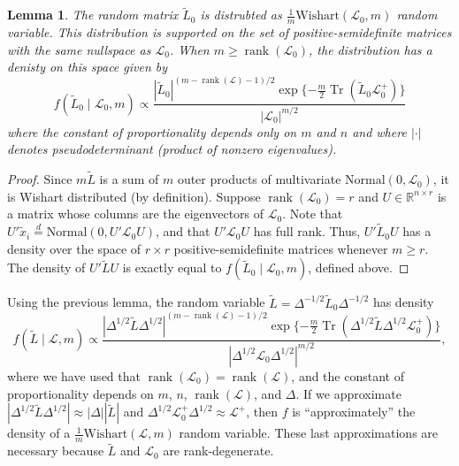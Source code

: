 \documentclass[12pt]{article}
\newcommand{\reals}{\mathbb{R}}
\DeclareMathOperator*{\Tr}{Tr}
\DeclareMathOperator*{\rank}{rank}
\theoremstyle{plain}
\newtheorem{lemma}[theorem]{Lemma}
\begin{document}
\begin{lemma}\label{L:approx-wishart}
  The random matrix $\tilde L_0$ is distrubted as $\tfrac{1}{m}
  \mathrm{Wishart }(\mathcal{L}_0, m)$ random variable.
  This distribution is supported on the set of
  positive-semidefinite matrices with the same nullspace as $\mathcal{L}_0$.  When
  $m \geq \rank(\mathcal{L}_0)$, the distribution has a denisty on this space
  given by
  \begin{equation}\label{E:wishart-density}
   f( \tilde L_0 \mid \mathcal{L}_0, m)
      \propto
      \frac{|\tilde L_0|^{(m - \rank(\mathcal{L}) - 1)/2}
        \exp\{-\tfrac{m}{2} \Tr(\tilde L_0 \mathcal{L}_0^+) \}}
        {|\mathcal{L}_0|^{m/2}}
  \end{equation}
  where the constant of proportionality depends only on $m$ and $n$
  and where $|\cdot|$ denotes pseudodeterminant (product of nonzero
  eigenvalues).
\end{lemma}
\begin{proof}
  Since $m \tilde L$ is a sum of $m$ outer products of multivariate
  $\mathrm{Normal}(0, \mathcal{L}_0)$, it is Wishart distributed
  (by definition).
  Suppose $\rank(\mathcal{L}_0) = r$ and
  $U \in \reals^{n \times r}$ is a matrix whose columns are the
    eigenvectors of $\mathcal{L}_0$.  Note that
    $U' \tilde x_i \overset{d}{=} \mathrm{Normal}(0, U' \mathcal{L}_0 U)$,
    and that $U' \mathcal{L}_0 U$ has full rank.  Thus,
    \(
      U' \tilde L_0 U
    \)
    has a density over the space of $r \times r$ positive-semidefinite
    matrices whenever $m \geq r$.  The density of $U' \tilde L U$ is
    exactly equal to $f(\tilde L_0 \mid \mathcal{L}_0, m)$,
    defined above.
\end{proof}


Using the previous lemma, the random variable $\tilde L = \Delta^{-1/2} \tilde L_0
\Delta^{-1/2}$ has density
\[
  f(\tilde L \mid \mathcal{L}, m)
    \propto
     \frac{|\Delta^{1/2} \tilde L \Delta^{1/2}|^{(m - \rank(\mathcal{L}) - 1)/2}
        \exp\{-\tfrac{m}{2} \Tr(\Delta^{1/2} \tilde L \Delta^{1/2} \mathcal{L}_0^+) \}}
        {|\Delta^{1/2} \mathcal{L}_0 \Delta^{1/2}|^{m/2}},
\]
where we have used that $\rank(\mathcal{L}_0) = \rank(\mathcal{L})$, and
the constant of proportionality depends on $m$, $n$,
$\rank(\mathcal{L})$, and $\Delta$.  If we approximate
$| \Delta^{1/2} \tilde L \Delta^{1/2}| \approx |\Delta| |\tilde L|$
and
$\Delta^{1/2} \mathcal{L}_0^+ \Delta^{1/2} \approx \mathcal{L}^+$,
then $f$ is ``approximately''  the density of a $\tfrac{1}{m}
\mathrm{Wishart }(\mathcal{L}, m)$ random variable.  These last
approximations are necessary because $\tilde L$ and $\mathcal{L}_0$
are rank-degenerate.
\end{document}
